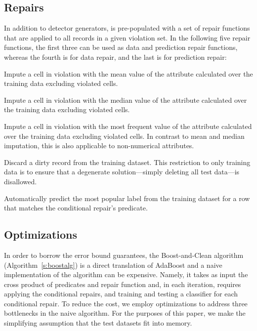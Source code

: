 \subsection{Repairs}
In addition to detector generators, \sys is pre-populated with a set of repair functions that are applied to all records in a given violation set.  In the following five repair functions, the first three can be used as data and prediction repair functions,  whereas the fourth is for data repair, and the last is for prediction repair:

 Impute a cell in violation with the mean value of the attribute calculated over the training data excluding violated cells.


 Impute a cell in violation with the median value of the attribute calculated over the training data excluding violated cells.

 Impute a cell in violation with the most frequent value of the attribute calculated over the training data excluding violated cells.  In contrast to mean and median imputation, this is also applicable to non-numerical attributes.

 Discard a dirty record from the training dataset.  This restriction to only training data is to ensure that a degenerate solution---simply deleting all test data---is disallowed. 

 Automatically predict the most popular label from the training dataset for a row that matches the conditional repair's predicate.




\subsection{Optimizations}
In order to borrow the error bound guarantees, the Boost-and-Clean algorithm (Algorithm~\ref{s:boostalg}) is a direct translation of AdaBoost and a naive implementation of the algorithm can be expensive.  Namely, it takes as input the cross product of predicates and repair function and, in each iteration, requires applying the conditional repairs, and training and testing a classifier for each conditional repair.  To reduce the cost, we employ optimizations to address three bottlenecks in the naive algorithm.  For the purposes of this paper, we make the simplifying assumption that the test datasets fit into memory.

